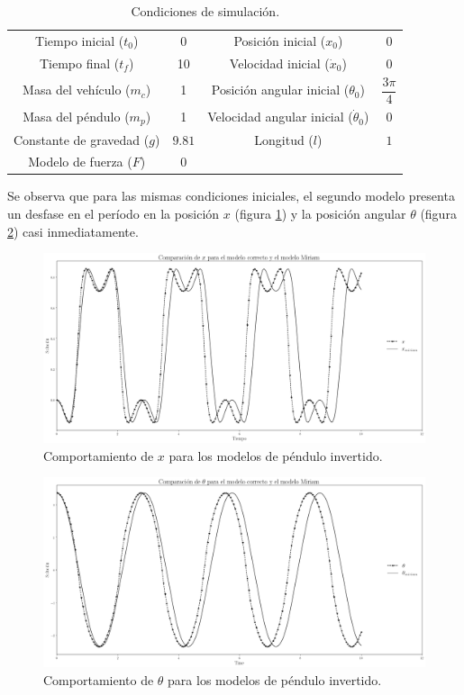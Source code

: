 \documentclass[12pt,letterpaper]{article}
\begin{document}
\begin{table}[h]
\begin{center}
\centering
\begin{tabular}{cccc}
\hline
Tiempo inicial ($t_0$) & 0  & Posición inicial ($x_0$) & $0$ \\
Tiempo final ($t_f$) & 10 & Velocidad inicial ($\dot{x}_0$)& $0$\\
Masa del vehículo ($m_c$) & 1 &  Posición angular inicial ($\theta_0$) & $\dfrac{3 \pi}{4}$\\
Masa del péndulo ($m_p$) & 1 & Velocidad angular inicial ($\dot{\theta}_0$)& $0$\\
Constante de gravedad ($g$) & $9.81$ & Longitud ($l$) & $1$ \\
Modelo de fuerza ($F$) & $0$ & & \\
\hline
\end{tabular}
\end{center}
 \caption{Condiciones de simulación.}
 \label{table: ip initial conditions}
\end{table}

Se observa que para las mismas condiciones iniciales, el segundo modelo presenta un desfase en el período en la posición $x$ (figura \ref{fig: ip x}) y la posición angular $\theta$ (figura \ref{fig: ip theta}) casi inmediatamente.

\begin{figure}[h]
 \centering
 \includegraphics[scale=0.2]{img/ip_x.png}
 \caption{Comportamiento de $x$ para los modelos de péndulo invertido.}
 \label{fig: ip x}
\end{figure}

\begin{figure}[h]
 \centering
 \includegraphics[scale=0.2]{img/ip_theta.png}
 \caption{Comportamiento de $\theta$ para los modelos de péndulo invertido.}
 \label{fig: ip theta}
\end{figure}

\pagebreak
\end{document}
